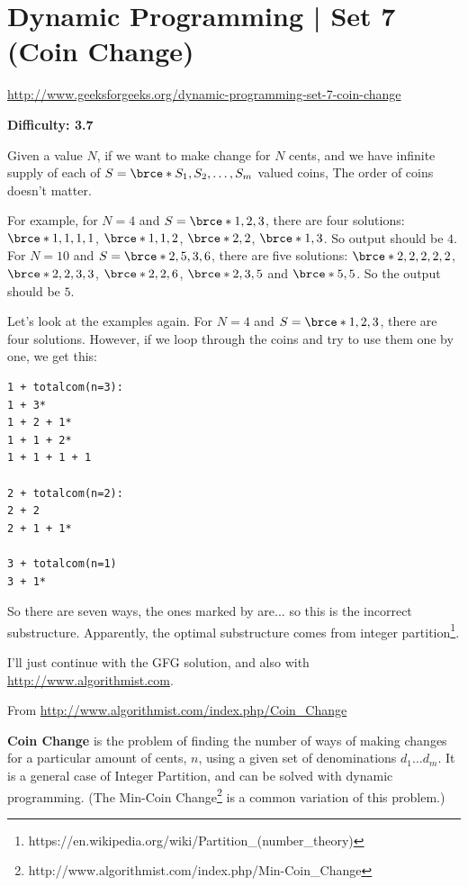 \section{Dynamic Programming | Set 7 (Coin Change)
  \label{secGFGDPSet7CoinChange}}

\url{http://www.geeksforgeeks.org/dynamic-programming-set-7-coin-change}

\textbf{Difficulty: 3.7}

Given a value $N$, if we want to make change for $N$ cents, and we have
infinite supply of each of $S=\brce*{S_1, S_2,\ldots,S_m}$ valued coins,
 The order of coins doesn't
matter.

For example, for $N=4$ and $S=\brce*{1,2,3}$, there are four solutions:
$\brce*{1,1,1,1}$, $\brce*{1,1,2}$, $\brce*{2,2}$, $\brce*{1,3}$. So output
should be $4$. For $N=10$ and $S=\brce*{2,5,3,6}$, there are five solutions:
$\brce*{2,2,2,2,2}$, $\brce*{2,2,3,3}$, $\brce*{2,2,6}$, $\brce*{2,3,5}$ and
$\brce*{5,5}$. So the output should be $5$.

\textbf{}

\RayNotesBegin

Let's look at the examples again. For $N=4$ and $S=\brce*{1,2,3}$, there are
four solutions. However, if we loop through the coins and try to use them
one by one, we get this:
\begin{lstlisting}[style=raygeneric]
1 + totalcom(n=3):
1 + 3*
1 + 2 + 1*
1 + 1 + 2*
1 + 1 + 1 + 1

2 + totalcom(n=2):
2 + 2
2 + 1 + 1*

3 + totalcom(n=1)
3 + 1*
\end{lstlisting}
So there are seven ways, the ones marked by \ctt{*} are... so this is the
incorrect substructure. Apparently, the optimal substructure comes from
integer
partition\footnote{https://en.wikipedia.org/wiki/Partition\_(number\_theory)}.

I'll just continue with the GFG solution, and also with
\url{http://www.algorithmist.com}.

\RayNotesEnd

From \url{http://www.algorithmist.com/index.php/Coin\_Change}


\textbf{Coin Change} is the problem of finding the number of ways of making
changes for a particular amount of cents, $n$, using a given set of
denominations $d_{1}\ldots d_{m}$. It is a general case of Integer
Partition, and can be solved with dynamic programming. (The Min-Coin
Change\footnote{http://www.algorithmist.com/index.php/Min-Coin\_Change} is a
common variation of this problem.)

